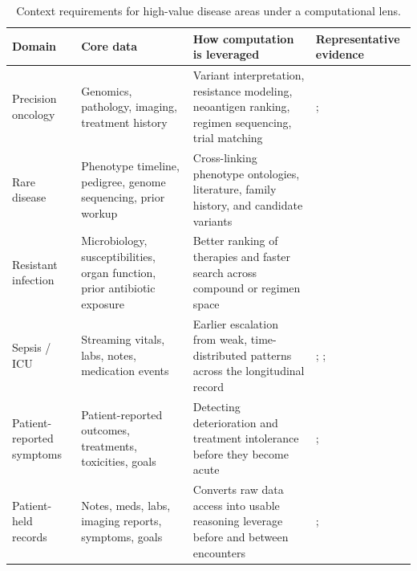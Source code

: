 \documentclass[11pt]{article}
\begin{document}
\begin{table}[t]
\centering
\small
\renewcommand{\arraystretch}{1.14}
\setlength{\tabcolsep}{4.5pt}
\begin{tabularx}{\textwidth}{>{\raggedright\arraybackslash}p{2.5cm} >{\raggedright\arraybackslash}p{2.7cm} >{\raggedright\arraybackslash}X >{\raggedright\arraybackslash}p{2.5cm}}
\toprule
\textbf{Domain} & \textbf{Core data} & \textbf{How computation is leveraged} & \textbf{Representative evidence} \\
\midrule
Precision oncology & Genomics, pathology, imaging, treatment history & Variant interpretation, resistance modeling, neoantigen ranking, regimen sequencing, trial matching & \citet{sahin2017}; \citet{jumper2021} \\
Rare disease & Phenotype timeline, pedigree, genome sequencing, prior workup & Cross-linking phenotype ontologies, literature, family history, and candidate variants & \citet{wojcik2024} \\
Resistant infection & Microbiology, susceptibilities, organ function, prior antibiotic exposure & Better ranking of therapies and faster search across compound or regimen space & \citet{stokes2020} \\
Sepsis / ICU & Streaming vitals, labs, notes, medication events & Earlier escalation from weak, time-distributed patterns across the longitudinal record & \citet{adams2022}; \citet{rajkomar2018}; \citet{moses2025} \\
Patient-reported symptoms & Patient-reported outcomes, treatments, toxicities, goals & Detecting deterioration and treatment intolerance before they become acute & \citet{basch2016}; \citet{basch2017} \\
Patient-held records & Notes, meds, labs, imaging reports, symptoms, goals & Converts raw data access into usable reasoning leverage before and between encounters & \citet{delbanco2010}; \citet{salmi2025} \\
\bottomrule
\end{tabularx}
\caption{Context requirements for high-value disease areas under a computational lens.}
\label{tab:cases}
\end{table}
\end{document}
